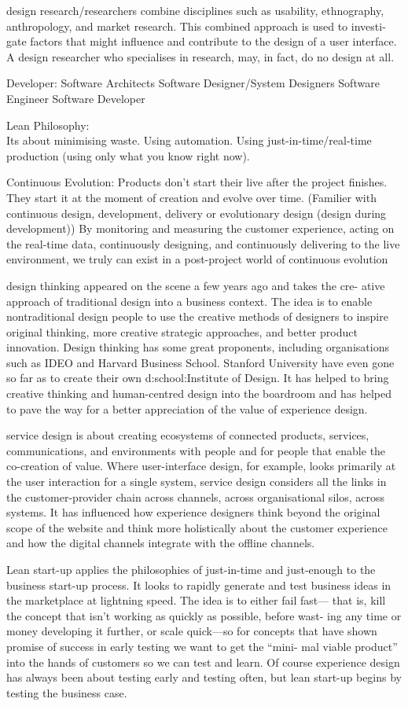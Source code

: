 design research/researchers combine disciplines such as usability, ethnography, anthropology, and market research. This combined approach is used to investi- gate factors that might influence and contribute to the design of a user interface. A design researcher who specialises in research, may, in fact, do no design at all.

Developer:
Software Architects
Software Designer/System Designers
Software Engineer
Software Developer

Lean Philosophy:\\
Its about minimising waste. Using automation. Using just-in-time/real-time production (using only what you know right now).

Continuous Evolution: 
Products don't start their live after the project finishes.\\
They start it at the moment of creation and evolve over time.
(Familier with continuous design, development, delivery or evolutionary design (design during development))
By monitoring and measuring the customer experience, acting on the real-time data, continuously designing, and continuously delivering to the live environment, we truly can exist in a post-project world of continuous evolution

design thinking appeared on the scene a few years ago and takes the cre- ative approach of traditional design into a business context. The idea is to enable nontraditional design people to use the creative methods of designers to inspire original thinking, more creative strategic approaches, and better product innovation. Design thinking has some great proponents, including organisations such as IDEO and Harvard Business School. Stanford University have even gone so far as to create their own d:school:Institute of Design.
It has helped to bring creative thinking and human-centred design into the boardroom and has helped to pave the way for a better appreciation of the value of experience design.

service design is about creating ecosystems of connected products, services, communications, and environments with people and for people that enable the co-creation of value. Where user-interface design, for example, looks primarily at the user interaction for a single system, service design considers all the links in the customer-provider chain across channels, across organisational silos, across systems. It has influenced how experience designers think beyond the original scope of the website and think more holistically about the customer experience and how the digital channels integrate with the offline channels.

Lean start-up applies the philosophies of just-in-time and just-enough to the business start-up process. It looks to rapidly generate and test business ideas in the marketplace at lightning speed. The idea is to either fail fast— that is, kill the concept that isn’t working as quickly as possible, before wast- ing any time or money developing it further, or scale quick—so for concepts that have shown promise of success in early testing we want to get the “mini- mal viable product” into the hands of customers so we can test and learn.
Of course experience design has always been about testing early and testing often, but lean start-up begins by testing the business case.